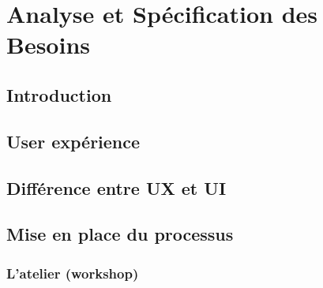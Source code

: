 \chapter{Analyse et Spécification des Besoins}
\label{sec:Analyse et Spécification des Besoins}
\section{Introduction}
\section{User expérience}
\section{Différence entre UX et UI}
\section{Mise en place du processus}
\subsection{L’atelier (workshop)}